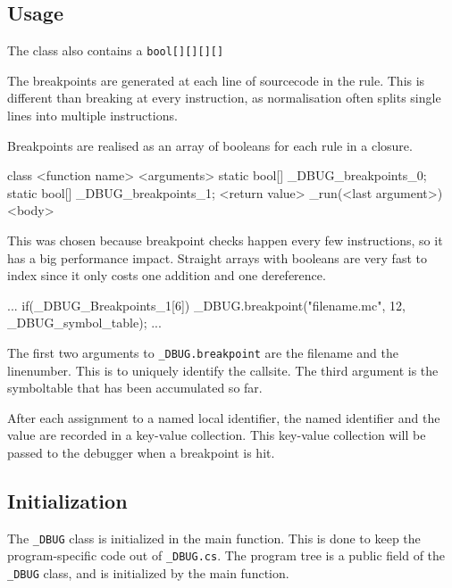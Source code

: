 \subsection{Usage}

The class also contains a \verb|bool[][][][]| 

The breakpoints are generated at each line of sourcecode in the rule.
This is different than breaking at every instruction, as normalisation often splits single lines into multiple instructions.

Breakpoints are realised as an array of booleans for each rule in a closure.

\begin{code}
    class <function name>{
        <arguments>
        static bool[] _DBUG_breakpoints_0;
        static bool[] _DBUG_breakpoints_1;
        <return value> _run(<last argument>){
            <body> 
        }
    }
\end{code}

This was chosen because breakpoint checks happen every few instructions, so it has a big performance impact.
Straight arrays with booleans are very fast to index since it only costs one addition and one dereference.

\begin{code}
    ...
    if(_DBUG_Breakpoints_1[6]){
        _DBUG.breakpoint("filename.mc", 12, 
                         _DBUG_symbol_table);
    }
    ...
\end{code}

The first two arguments to \verb|_DBUG.breakpoint| are the filename and the linenumber.
This is to uniquely identify the callsite.
The third argument is the symboltable that has been accumulated so far.

After each assignment to a named local identifier, the named identifier and the value are recorded in a key-value collection. 
This key-value collection will be passed to the debugger when a breakpoint is hit.

\subsection{Initialization}
The \verb|_DBUG| class is initialized in the main function.
This is done to keep the program-specific code out of \verb|_DBUG.cs|.
The program tree is a public field of the \verb|_DBUG| class, and is initialized by the main function.


